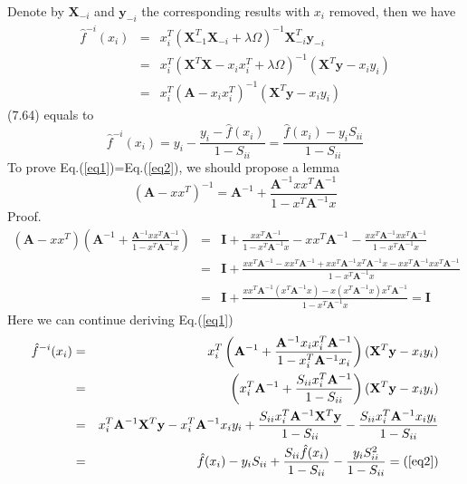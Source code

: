 \documentclass[11pt, oneside]{article}   	%
\begin{document}
    Denote by $\mathbf{X}_{-i}$ and $\mathbf{y}_{-i}$ the corresponding results with $x_i$ removed, then we have
    \begin{eqnarray}
        \hat{f}^{-i}(x_i) &=& x_i^T(\mathbf{X}_{-1}^T \mathbf{X}_{-i} + \lambda \Omega)^{-1} \mathbf{X}_{-i}^T \mathbf{y}_{-i} \nonumber \\
        &=& x_i^T (\mathbf{X}^T \mathbf{X} - x_i x_i^T + \lambda \Omega)^{-1} (\mathbf{X}^T \mathbf{y} - x_i y_i) \nonumber \\
        &=& x_i^T ( \mathbf{A} - x_i x_i^T)^{-1}(\mathbf{X}^T \mathbf{y} - x_i y_i) 
        \label{eq1}
    \end{eqnarray}
    (7.64) equals to
    \begin{equation}
        \hat{f}^{-i}(x_i) = y_i - \frac{y_i - \hat{f}(x_i)}{1 - S_{ii}} = \frac{\hat{f}(x_i) - y_i S_{ii}}{1 - S_{ii}}
        \label{eq2}
    \end{equation}
    To prove Eq.(\ref{eq1})=Eq.(\ref{eq2}), we should propose a lemma
    \begin{equation}
        (\mathbf{A} - xx^T)^{-1} = \mathbf{A}^{-1} + \frac{\mathbf{A}^{-1} xx^T \mathbf{A}^{-1}}{1 - x^T \mathbf{A}^{-1} x}
    \end{equation}
    Proof.
    \begin{eqnarray}
        (\mathbf{A} - xx^T)(\mathbf{A}^{-1} + \frac{\mathbf{A}^{-1} xx^T \mathbf{A}^{-1}}{1 - x^T \mathbf{A}^{-1} x}) &=& \mathbf{I} + \frac{xx^T \mathbf{A}^{-1}}{1-x^T \mathbf{A}^{-1} x} - xx^T \mathbf{A}^{-1} - \frac{xx^T \mathbf{A}^{-1} xx^T \mathbf{A}^{-1} }{1-x^T \mathbf{A}^{-1} x} \nonumber \\
        &=& \mathbf{I} + \frac{xx^T \mathbf{A}^{-1} - xx^T \mathbf{A}^{-1} + xx^T\mathbf{A}^{-1} x^T \mathbf{A}^{-1} x - xx^T \mathbf{A}^{-1} xx^T \mathbf{A}^{-1} }{1- x^T \mathbf{A}^{-1} x} \nonumber \\
        &=& \mathbf{I} + \frac{xx^T \mathbf{A}^{-1} (x^T \mathbf{A}^{-1} x) - x(x^T \mathbf{A}^{-1} x) x^T \mathbf{A}^{-1} }{1- x^T \mathbf{A}^{-1} x} = \mathbf{I} \nonumber
    \end{eqnarray}
    Here we can continue deriving Eq.(\ref{eq1})
    \begin{eqnarray}
        \hat{f}^{-i}(x_i) &=& x_i^T \left( \mathbf{A}^{-1} + \frac{\mathbf{A}^{-1} x_i x_i^T \mathbf{A}^{-1}}{1 - x_i^T \mathbf{A}^{-1} x_i} \right) (\mathbf{X}^T \mathbf{y} - x_i y_i) \nonumber \\
        &=& \left( x_i^T \mathbf{A}^{-1} + \frac{S_{ii} x_i^T \mathbf{A}^{-1} }{1 - S_{ii} } \right) (\mathbf{X}^T \mathbf{y} - x_i y_i) \\
        &=& x_i^T \mathbf{A}^{-1} \mathbf{X}^T \mathbf{y} - x_i^T \mathbf{A}^{-1} x_i y_i + \frac{S_{ii} x_i^T \mathbf{A}^{-1} \mathbf{X}^T \mathbf{y} }{1 - S_{ii}} - \frac{S_{ii} x_i^T \mathbf{A}^{-1} x_i y_i}{1 - S_{ii}} \nonumber \\
        &=& \hat{f}(x_i) - y_i S_{ii} + \frac{S_{ii} \hat{f}(x_i)}{1 - S_{ii}} - \frac{y_i S_{ii}^2}{1 - S_{ii}} = (\ref{eq2}) \nonumber
    \end{eqnarray}
\end{document}
